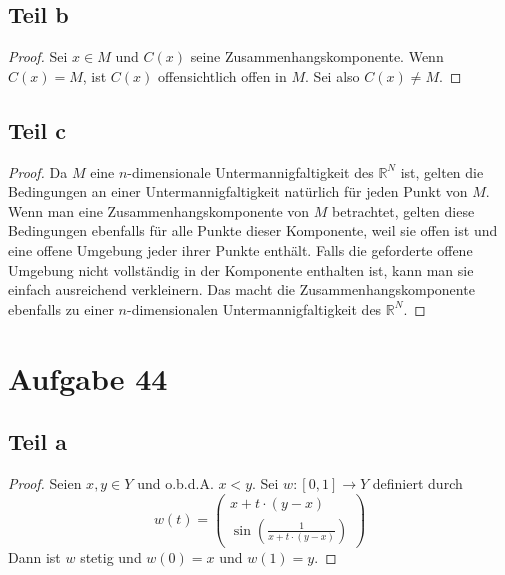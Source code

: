 \documentclass[10pt,a4paper]{article}
\begin{document}
\subsection{Teil b}
\begin{proof}
  Sei $x \in M$ und $C(x)$ seine Zusammenhangskomponente.
  Wenn $C(x) = M$, ist $C(x)$ offensichtlich offen in $M$.
  Sei also $C(x) \ne M$.

\end{proof}

\subsection{Teil c}
\begin{proof}
  Da $M$ eine $n$-dimensionale Untermannigfaltigkeit des $\mathbb{R}^{N}$ ist, gelten die Bedingungen an einer Untermannigfaltigkeit natürlich für jeden Punkt von $M$.
  Wenn man eine Zusammenhangskomponente von $M$ betrachtet, gelten diese Bedingungen ebenfalls für alle Punkte dieser Komponente, weil sie offen ist und eine offene Umgebung jeder ihrer Punkte enthält.
  Falls die geforderte offene Umgebung nicht vollständig in der Komponente enthalten ist, kann man sie einfach ausreichend verkleinern.
  Das macht die Zusammenhangskomponente ebenfalls zu einer $n$-dimensionalen Untermannigfaltigkeit des $\mathbb{R}^{N}$.
\end{proof}

\section{Aufgabe 44}

\subsection{Teil a}
\begin{proof}
  Seien $x, y \in Y$ und o.b.d.A. $x < y$.
  Sei $w : [0, 1] \rightarrow Y$ definiert durch
  \begin{equation}
    w(t) = \begin{pmatrix}
      x + t \cdot (y - x)\\
      \sin(\frac{1}{x + t \cdot (y - x)})
    \end{pmatrix}
  \end{equation}
  Dann ist $w$ stetig und $w(0) = x$ und $w(1) = y$.
\end{proof}
\end{document}
